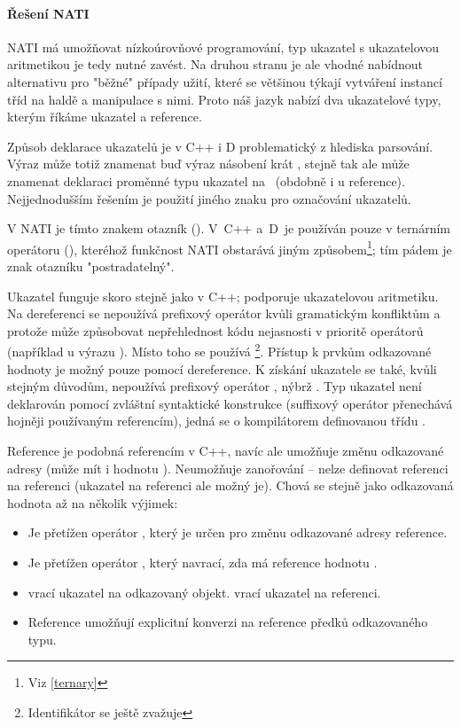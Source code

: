 \paragraph{Řešení NATI} 
NATI má umožňovat nízkoúrovňové programování, typ ukazatel s ukazatelovou aritmetikou je tedy nutné zavést. Na druhou stranu je ale vhodné nabídnout alternativu pro "běžné" případy užití, které se většinou týkají vytváření instancí tříd na haldě a manipulace s nimi. Proto náš jazyk nabízí dva ukazatelové typy, kterým říkáme ukazatel a reference.

Způsob deklarace ukazatelů je v C++ i D problematický z hlediska parsování. Výraz  může totiž znamenat buď výraz násobení  krát , stejně tak ale může znamenat deklaraci proměnné  typu ukazatel na ~(obdobně i u reference). Nejjednodušším řešením je použití jiného znaku pro označování ukazatelů.

V NATI je tímto znakem otazník (). V~C++ a~D~je používán pouze v ternárním operátoru (), kteréhož funkčnost NATI obstarává jiným způsobem\footnote{Viz \ref{ternary}}; tím pádem je znak otazníku "postradatelný".

Ukazatel funguje skoro stejně jako v C++; podporuje ukazatelovou aritmetiku. Na dereferenci se nepoužívá prefixový operátor  kvůli gramatickým konfliktům a protože může způsobovat nepřehlednost kódu nejasnosti v prioritě operátorů (například u výrazu ). Místo toho se používá \footnote{Identifikátor se ještě zvažuje}. Přístup k prvkům odkazované hodnoty je možný pouze pomocí dereference. K získání ukazatele se také, kvůli stejným důvodům, nepoužívá prefixový operátor , nýbrž . Typ ukazatel není deklarován pomocí zvláštní syntaktické konstrukce (suffixový operátor  přenechává hojněji používaným referencím), jedná se o kompilátorem definovanou třídu .

Reference je podobná referencím v C++, navíc ale umožňuje změnu odkazované adresy (může mít i hodnotu ). Neumožňuje zanořování -- nelze definovat referenci na referenci (ukazatel na referenci ale možný je). Chová se stejně jako odkazovaná hodnota až na několik výjimek:
\begin{itemize}
	\item Je přetížen operátor , který je určen pro změnu odkazované adresy reference.
	\item Je přetížen operátor , který navrací, zda má reference hodnotu .
	\item {} vrací ukazatel na odkazovaný objekt.  vrací ukazatel na referenci.
	\item Reference umožňují explicitní konverzi na reference předků odkazovaného typu.
\end{itemize}

